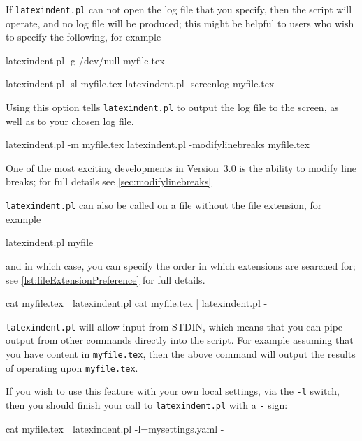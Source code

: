 	 If \texttt{latexindent.pl} can not open
	the log file that you specify, then the script will operate, and no log file will be
	produced; this might be helpful to users who wish to specify the following, for example
	\begin{commandshell}
latexindent.pl -g /dev/null myfile.tex
\end{commandshell}

	\begin{commandshell}
latexindent.pl -sl myfile.tex
latexindent.pl -screenlog myfile.tex
\end{commandshell}
	Using this%
	 option tells \texttt{latexindent.pl} to output the log file to the screen, as
	well as to your chosen log file.

	\begin{commandshell}
latexindent.pl -m myfile.tex
latexindent.pl -modifylinebreaks myfile.tex
\end{commandshell}

	One of the most exciting developments in Version~3.0 is the ability to modify line
	breaks; for full details see \vref{sec:modifylinebreaks}

	\texttt{latexindent.pl} can also be called on a file without the file extension, for
	example
	\begin{commandshell}
latexindent.pl myfile
\end{commandshell}
	and in which case, you can specify the order in which extensions are searched for; see
	\vref{lst:fileExtensionPreference} for full details.
	\begin{commandshell}
cat myfile.tex | latexindent.pl
cat myfile.tex | latexindent.pl -
\end{commandshell}
	\texttt{latexindent.pl} will%
	 allow input from STDIN, which means that you can
	pipe output from other commands directly into the script. For example assuming that you
	have content in \texttt{myfile.tex}, then the above command will output the results of
	operating upon \texttt{myfile.tex}.

	If you wish to use this feature with your own local settings, via the \texttt{-l} switch,
	then you should finish your call to \texttt{latexindent.pl} with a \texttt{-} sign:
	\begin{commandshell}
cat myfile.tex | latexindent.pl -l=mysettings.yaml -
\end{commandshell}

